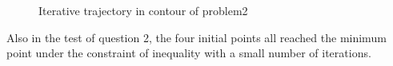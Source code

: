 \begin{figure}[H]
{}
\quad
{}
\caption{ Iterative trajectory in contour of problem2}
\end{figure}

Also in the test of question 2, the four initial points all reached the minimum point under the constraint of inequality with a small number of iterations.
\newpage
